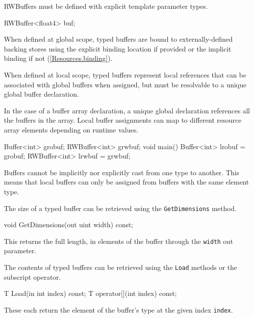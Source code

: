 RWBuffers must be defined with explicit template parameter types.
\begin{HLSL}
  RWBuffer<float4> buf;
\end{HLSL}

When defined at global scope, typed buffers are bound to externally-defined backing stores
using the explicit binding location if provided or the implicit binding if not (\ref{Resources.binding}).

When defined at local scope, typed buffers represent local references
that can be associated with global buffers when assigned,
but must be resolvable to a unique global buffer declaration.

\begin{note}
In the case of a buffer array declaration, a unique global declaration references all the buffers in the array.
Local buffer assignments can map to different resource array elements depending on runtime values.
\end{note}

\begin{HLSL}
  Buffer<int> grobuf;
  RWBuffer<int> grwbuf;
  void main() {
    Buffer<int> lrobuf = grobuf;
    RWBuffer<int> lrwbuf = grwbuf;
  }
\end{HLSL}

Buffers cannot be implicitly nor explicitly cast from one type to another.
This means that local buffers can only be assigned from buffers with the same element type.


The size of a typed buffer can be retrieved using the \texttt{GetDimensions} method.
\begin{HLSL}
void GetDimensions(out uint width) const;
\end{HLSL}

This returns the full length, in elements of the buffer through the \texttt{width} out parameter.


The contents of typed buffers can be retrieved using the \texttt{Load} methods
or the subscript operator.

\begin{HLSL}
 T Load(in int index) const;
 T operator[](int index) const;
\end{HLSL}

These each return the element of the buffer's type at the given index \texttt{index}.

